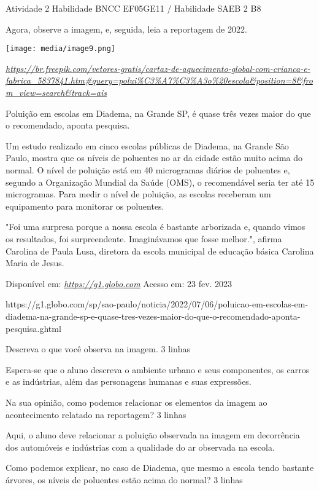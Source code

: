 Atividade 2 Habilidade BNCC EF05GE11 / Habilidade SAEB 2 B8

Agora, observe a imagem, e, seguida, leia a reportagem de 2022.

\texttt{[image: media/image9.png]}

\href{https://br.freepik.com/vetores-gratis/cartaz-de-aquecimento-global-com-crianca-e-fabrica_5837841.htm\#query=polui\%C3\%A7\%C3\%A3o\%20escola\&position=8\&from_view=search\&track=ais}{\emph{https://br.freepik.com/vetores-gratis/cartaz-de-aquecimento-global-com-crianca-e-fabrica\_5837841.htm\#query=polui\%C3\%A7\%C3\%A3o\%20escola\&position=8\&from\_view=search\&track=ais}}

Poluição em escolas em Diadema, na Grande SP, é quase três vezes maior
do que o recomendado, aponta pesquisa.

Um estudo realizado em cinco escolas públicas de Diadema, na Grande São
Paulo, mostra que os níveis de poluentes no ar da cidade estão muito
acima do normal. O nível de poluição está em 40 microgramas diários de
poluentes e, segundo a Organização Mundial da Saúde (OMS), o
recomendável seria ter até 15 microgramas. Para medir o nível de
poluição, as escolas receberam um equipamento para monitorar os
poluentes.

"Foi uma surpresa porque a nossa escola é bastante arborizada e, quando
vimos os resultados, foi surpreendente. Imaginávamos que fosse melhor.",
afirma Carolina de Paula Lusa, diretora da escola municipal de educação
básica Carolina Maria de Jesus.

Disponível em: \href{https://g1.globo.com}{\emph{https://g1.globo.com}}
Acesso em: 23 fev. 2023

https://g1.globo.com/sp/sao-paulo/noticia/2022/07/06/poluicao-em-escolas-em-diadema-na-grande-sp-e-quase-tres-vezes-maior-do-que-o-recomendado-aponta-pesquisa.ghtml

Descreva o que você observa na imagem. 3 linhas

Espera-se que o aluno descreva o ambiente urbano e seus componentes, os
carros e as indústrias, além das personagens humanas e suas expressões.

Na sua opinião, como podemos relacionar os elementos da imagem ao
acontecimento relatado na reportagem? 3 linhas

Aqui, o aluno deve relacionar a poluição observada na imagem em
decorrência dos automóveis e indústrias com a qualidade do ar observada
na escola.

Como podemos explicar, no caso de Diadema, que mesmo a escola tendo
bastante árvores, os níveis de poluentes estão acima do normal? 3 linhas


